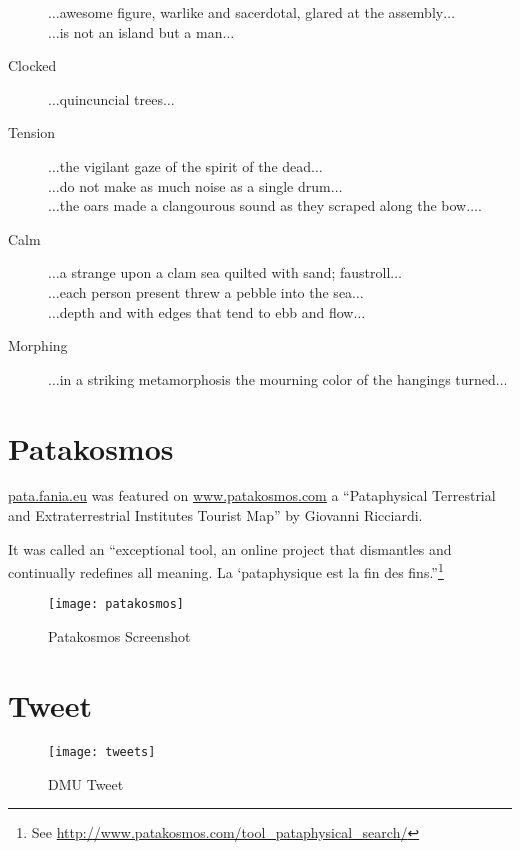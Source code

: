 \begin{description}
                $\ldots$awesome figure, warlike and sacerdotal, glared at the assembly$\ldots$\\
                $\ldots$is not an island but a man$\ldots$
  \item [Clocked] $\ldots$quincuncial trees$\ldots$
  \item [Tension] $\ldots$the vigilant gaze of the spirit of the dead$\ldots$\\
                    $\ldots$do not make as much noise as a single drum$\ldots$\\
                    $\ldots$the oars made a clangourous sound as they scraped along the bow$\ldots$.
  \item [Calm] $\ldots$a strange upon a clam sea quilted with sand; faustroll$\ldots$\\
                  $\ldots$each person present threw a pebble into the sea$\ldots$\\
                  $\ldots$depth and with edges that tend to ebb and flow$\ldots$
  \item [Morphing] $\ldots$in a striking metamorphosis the mourning color of the hangings turned$\ldots$
\end{description}

\spirals




\section{Patakosmos}

\url{pata.fania.eu} was featured on \url{www.patakosmos.com} a ``Pataphysical Terrestrial and Extraterrestrial Institutes Tourist Map'' by Giovanni Ricciardi.

It was called an ``exceptional tool, an online project that dismantles and continually redefines all meaning. La ‘pataphysique est la fin des fins.''\footnote{See \url{http://www.patakosmos.com/tool_pataphysical_search/}}

\begin{figure}[h!]
  \centering
  \texttt{[image: patakosmos]}
\caption[Patakosmos Screenshot]{Patakosmos Screenshot}
\label{fig:patakosmos}
\end{figure}


\section{Tweet}

\begin{figure}[h!]
  \centering
  \texttt{[image: tweets]}
\caption[DMU Tweet]{DMU Tweet}
\label{fig:tweet}
\end{figure}



\stopcontents[chapters]

